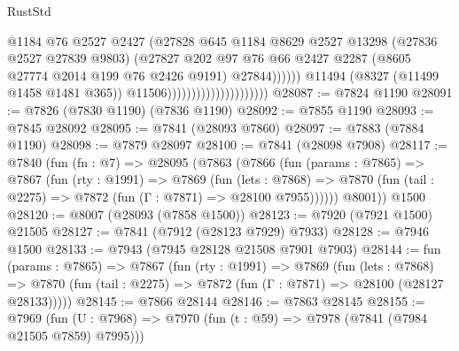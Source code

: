 \begin{lexlean}{RustStd}
\begin{coremodule}
{\begin{coremodule}
{{{{{{{{{{{{{{{{{{{{{{{{{{{{{{{{{{{{{{{{{{{{{{{{{{{{{{                                                      @1184
                                                      @76
                                                      @2527
                                                      @2427
                                                      (@27828
                                                        @645
                                                        @1184
                                                        @8629
                                                        @2527
                                                        @13298
                                                        (@27836 @2527 @27839 @9803)
                                                        (@27827
                                                          @202
                                                          @97
                                                          @76
                                                          @66
                                                          @2427
                                                          @2287
                                                          (@8605 @27774 @2014 @199 @76 @2426 @9191)
                                                          @27844))))))
                                              @11494
                                              (@8327 (@11499 @1458 @1481 @365))
                                              @11506)))))))))))))))))))))
@28087 := @7824 @1190
@28091 := @7826 (@7830 @1190) (@7836 @1190)
@28092 := @7855 @1190
@28093 := @7845 @28092
@28095 := @7841 (@28093 @7860)
@28097 := @7883 (@7884 @1190)
@28098 := @7879 @28097
@28100 := @7841 (@28098 @7908)
@28117 := @7840
    (fun (fn : @7) =>
    @28095
      (@7863
        (@7866
          (fun (params : @7865) =>
          @7867
            (fun (rty : @1991) =>
            @7869
              (fun (lets : @7868) =>
              @7870 (fun (tail : @2275) => @7872 (fun (Γ : @7871) => @28100 @7955))))))
        @8001))
    @1500
@28120 := @8007 (@28093 (@7858 @1500))
@28123 := @7920 (@7921 @1500) @21505
@28127 := @7841 (@7912 (@28123 @7929) @7933)
@28128 := @7946 @1500
@28133 := @7943 (@7945 @28128 @21508 @7901 @7903)
@28144 := fun (params : @7865) =>
  @7867
    (fun (rty : @1991) =>
    @7869
      (fun (lets : @7868) =>
      @7870 (fun (tail : @2275) => @7872 (fun (Γ : @7871) => @28100 (@28127 @28133)))))
@28145 := @7866 @28144
@28146 := @7863 @28145
@28155 := @7969
    (fun (U : @7968) => @7970 (fun (t : @59) => @7978 (@7841 (@7984 @21505 @7859) @7995)))
}}}}}}}}}}}}}}}}}}}}}}}}}}}}}}}}}}}}}}}}}}}}}}}}}}}}}}
\end{coremodule}}
\end{coremodule}
\end{lexlean}
